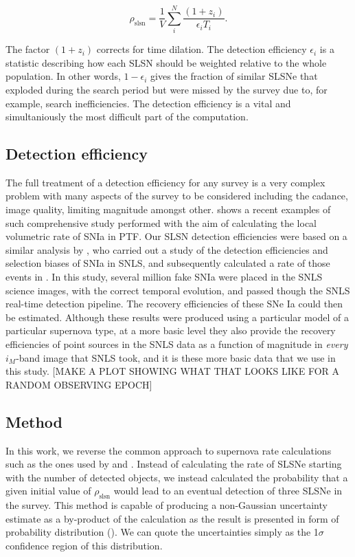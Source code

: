 \begin{equation}
\label{eq:rate}
\rho_{\mathrm{slsn}} = \frac{1}{V}\sum^{N}_{i}\frac{(1+z_i)}{\epsilon_{i}T_{i}}.
\end{equation}

The factor $(1+z_i)$ corrects for time dilation. The detection efficiency $\epsilon_i$ is a statistic describing how each SLSN should be weighted relative to the whole population. In other words, $1-\epsilon_i$ gives the fraction of similar SLSNe that exploded during the search period but were missed by the survey due to, for example, search inefficiencies. The detection efficiency is a vital and simultaniously the most difficult part of the computation.

\subsection{Detection efficiency}
The full treatment of a detection efficiency for any survey is a very complex problem with many aspects of the survey to be considered including the cadance, image quality, limiting magnitude amongst other. \citet{Frohmaier2017} shows a recent examples of such comprehensive study performed with the aim of calculating the local volumetric rate of SNIa in PTF. Our SLSN detection efficiencies were based on a similar analysis by \citet{Perrett2010}, who carried out a study of the detection efficiencies and selection biases of SNIa in SNLS, and subsequently calculated a rate of those events in \cite{Perrett2012}. In this study, several million fake SNIa were placed in the SNLS science images, with the correct temporal evolution, and passed though the SNLS real-time detection pipeline. The recovery efficiencies of these SNe Ia could then be estimated. Although these results were produced using a particular model of a particular supernova type, at a more basic level they also provide the recovery efficiencies of point sources in the SNLS data as a function of magnitude in \textit{every} $i_M$-band image that SNLS took, and it is these more basic data that we use in this study. [MAKE A PLOT SHOWING WHAT THAT LOOKS LIKE FOR A RANDOM OBSERVING EPOCH]

\subsection{Method}
In this work, we reverse the common approach to supernova rate calculations such as the ones used by \citet{Perrett2012} and \citep{Frohmaier2017}. Instead of calculating the rate of SLSNe starting with the number of detected objects, we instead calculated the probability that a given initial value of $\rho_{\mathrm{slsn}}$ would lead to an eventual detection of three SLSNe in the survey. This method is capable of producing a non-Gaussian uncertainty estimate as a by-product of the calculation as the result is presented in form of probability distribution (). We can quote the uncertainties simply as the 1$\sigma$ confidence region of this distribution.

